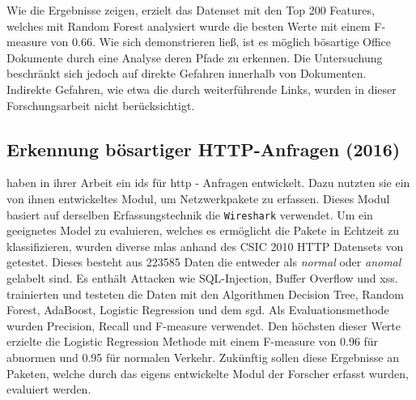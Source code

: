 \documentclass[
    12pt, %
    DIV10,
    ngerman, %
    a4paper, %
    oneside, %
    titlepage, %
    parskip=half, %
    headings=normal, %
    listof=totoc, %
    bibliography=totoc, %
    index=totoc, %
    captions=tableheading, %
    final %
]{scrreprt}
\begin{document}
Wie die Ergebnisse zeigen, erzielt das Datenset mit den Top 200 Features, welches mit Random Forest analysiert wurde die besten Werte mit einem F-measure von 0.66.
Wie sich demonstrieren ließ, ist es möglich bösartige Office Dokumente durch eine Analyse deren Pfade zu erkennen. 
Die Untersuchung beschränkt sich jedoch auf direkte Gefahren innerhalb von Dokumenten. Indirekte Gefahren, wie etwa die durch weiterführende Links, wurden in dieser Forschungsarbeit nicht berücksichtigt.
\subsection{Erkennung bösartiger HTTP-Anfragen (2016)}\label{csic}
\textcite{Pham2016} haben in ihrer Arbeit ein \ac{ids} für \ac{http} - Anfragen entwickelt. Dazu nutzten sie ein von ihnen entwickeltes Modul, um Netzwerkpakete zu erfassen. Dieses Modul basiert auf derselben Erfassungstechnik die \texttt{Wireshark} verwendet. Um ein geeignetes Model zu evaluieren, welches es ermöglicht die Pakete in Echtzeit zu klassifizieren, wurden diverse \ac{mlas} anhand des CSIC 2010 HTTP Datensets von \textcite{csic} getestet. Dieses besteht aus 223585 Daten die entweder als \emph{normal} oder \emph{anomal} gelabelt sind. Es enthält Attacken wie SQL-Injection, Buffer Overflow und \ac{xss}. \textcite{Pham2016} trainierten und testeten die Daten mit den Algorithmen Decision Tree, Random Forest, AdaBoost, Logistic Regression und dem  \ac{sgd}. Als Evaluationsmethode wurden Precision, Recall und F-measure verwendet. Den höchsten dieser Werte erzielte die Logistic Regression Methode mit einem F-measure von 0.96 für abnormen und 0.95 für normalen Verkehr. Zukünftig sollen diese Ergebnisse an Paketen, welche durch das eigens entwickelte Modul der Forscher erfasst wurden, evaluiert werden.
%
\end{document}
